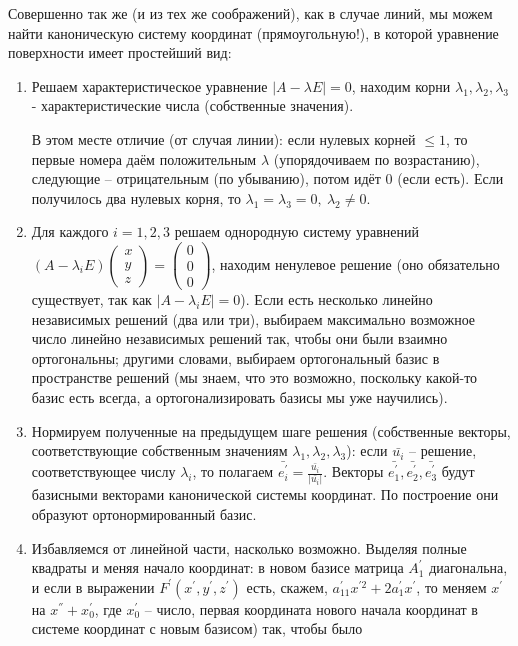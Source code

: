 \documentclass[a4paper, 12pt]{article}
\theoremstyle{definition}
\begin{document}
Совершенно так же (и из тех же соображений), как в случае линий, мы можем найти каноническую систему координат (прямоугольную!), в которой уравнение поверхности имеет простейший вид:

\begin{enumerate}
    \item Решаем характеристическое уравнение $|A - \lambda E| = 0$, находим корни $\lambda_1, \lambda_2, \lambda_3$ - характеристические числа (собственные значения).
    
    В этом месте отличие (от случая линии): если нулевых корней $\leqslant 1$, то первые номера даём положительным $\lambda$ (упорядочиваем по возрастанию), следующие – отрицательным (по убыванию), потом идёт 0 (если есть). Если получилось два нулевых корня, то $\lambda_1 = \lambda_3 = 0, \ \lambda_2 \neq 0$.
    \item Для каждого $i = 1, 2, 3$ решаем однородную систему уравнений $(A - \lambda_i E) \begin{pmatrix} x \\ y \\ z \end{pmatrix} = \begin{pmatrix} 0\\0\\0 \end{pmatrix}$, находим ненулевое решение (оно обязательно существует, так как $|A - \lambda_i E| = 0$). Если есть несколько линейно независимых решений (два или три), выбираем максимально возможное число линейно независимых решений так, чтобы они были взаимно ортогональны;
    другими словами, выбираем ортогональный базис в пространстве решений (мы знаем, что это возможно, поскольку какой-то базис есть всегда, а ортогонализировать базисы мы уже научились).
    \item Нормируем полученные на предыдущем шаге решения (собственные векторы, соответствующие собственным значениям $\lambda_1, \lambda_2, \lambda_3$):
    если $\bar{u_i}$ – решение, соответствующее числу $\lambda_i$, то полагаем $\bar{e_i^{'}} = \frac{\bar{u_i}}{|\bar{u_i}|}$.
    Векторы $\bar{e_1^{'}}, \bar{e_2^{'}}, \bar{e_3^{'}}$ будут базисными векторами канонической системы координат. По построение они образуют ортонормированный базис.
    \item Избавляемся от линейной части, насколько возможно.
    Выделяя полные квадраты и меняя начало координат: в новом базисе матрица $A_1^{'}$ диагональна, и если в выражении $F^{'}(x^{'},y^{'},z^{'})$ есть, скажем, $a_{11}^{'} x^{'2} + 2a_{1}^{'} x^{'}$, то меняем $x^{'}$ на $x^{''} + x_0^{'}$, где $x_0^{'}$ – число, первая координата нового начала координат в системе координат с новым базисом) так, чтобы было

\end{enumerate}
\end{document}
